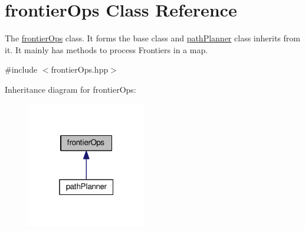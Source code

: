 \hypertarget{classfrontierOps}{}\section{frontier\+Ops Class Reference}
\label{classfrontierOps}


The \hyperlink{classfrontierOps}{frontier\+Ops} class. It forms the base class and \hyperlink{classpathPlanner}{path\+Planner} class inherits from it. It mainly has methods to process Frontiers in a map.  




{\ttfamily \#include $<$frontier\+Ops.\+hpp$>$}



Inheritance diagram for frontier\+Ops\+:
\nopagebreak
\begin{figure}[H]
\begin{center}
\leavevmode
\includegraphics[width=148pt]{classfrontierOps__inherit__graph}
\end{center}
\end{figure}
